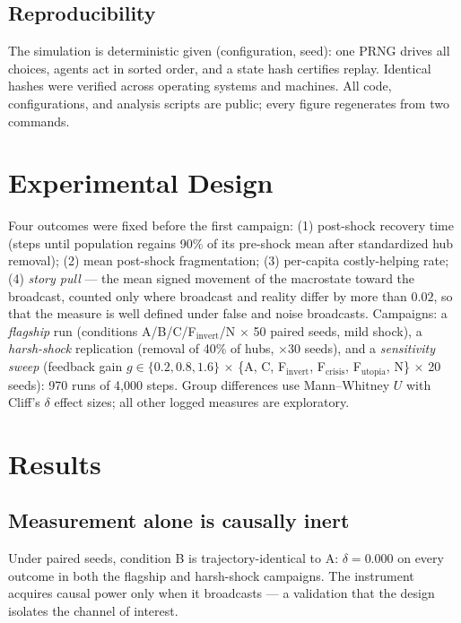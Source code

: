 \documentclass[10pt]{article}
\begin{document}
\subsection{Reproducibility}
The simulation is deterministic given (configuration, seed): one PRNG drives
all choices, agents act in sorted order, and a state hash certifies replay.
Identical hashes were verified across operating systems and machines. All
code, configurations, and analysis scripts are public; every figure regenerates
from two commands.

\section{Experimental Design}
Four outcomes were fixed before the first campaign: (1) post-shock recovery
time (steps until population regains 90\% of its pre-shock mean after
standardized hub removal); (2) mean post-shock fragmentation; (3) per-capita
costly-helping rate; (4) \emph{story pull} --- the mean signed movement of the
macrostate toward the broadcast, counted only where broadcast and reality
differ by more than $0.02$, so that the measure is well defined under false and
noise broadcasts. Campaigns: a \emph{flagship} run (conditions
A/B/C/F$_{\mathrm{invert}}$/N $\times$ 50 paired seeds, mild shock), a
\emph{harsh-shock} replication (removal of 40\% of hubs, $\times$30 seeds), and
a \emph{sensitivity sweep} (feedback gain $g\in\{0.2,0.8,1.6\}$ $\times$
\{A, C, F$_{\mathrm{invert}}$, F$_{\mathrm{crisis}}$, F$_{\mathrm{utopia}}$,
N\} $\times$ 20 seeds): 970 runs of 4{,}000 steps. Group differences use
Mann--Whitney $U$ with Cliff's $\delta$ effect sizes; all other logged
measures are exploratory.

\section{Results}
\subsection{Measurement alone is causally inert}
Under paired seeds, condition B is trajectory-identical to A: $\delta=0.000$
on every outcome in both the flagship and harsh-shock campaigns. The
instrument acquires causal power only when it broadcasts --- a validation that
the design isolates the channel of interest.
\end{document}
